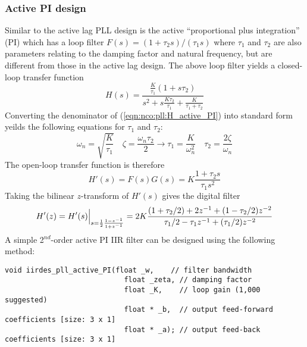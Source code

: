 \subsubsection{Active PI design}
\label{module:nco:pll:active_PI}
Similar to the active lag PLL design is the
active ``proportional plus integration'' (PI)
which has a loop filter
$F(s) = (1 + \tau_2 s)/(\tau_1 s)$
where $\tau_1$ and $\tau_2$ are also parameters relating to the damping
factor and natural frequency,
but are different from those in the active lag design.
The above loop filter yields a closed-loop transfer function
%
\begin{equation}
\label{eqn:nco:pll:H_active_PI}
    H(s) = \frac{
                \frac{K}{\tau_1} (1 + s\tau_2)
           } {
                s^2 + s\frac{K\tau_2}{\tau_1} + \frac{K}{\tau_1 + \tau_2}
           }
\end{equation}
%
Converting the denominator of (\ref{eqn:nco:pll:H_active_PI}) into
standard form yeilds the following equations for $\tau_1$ and $\tau_2$:
%
\begin{equation}
    \omega_n = \sqrt{\frac{K}{\tau_1}}
    \,\,\,\,\,\,
    \zeta = \frac{\omega_n \tau_2}{2}
        \rightarrow
    \tau_1 = \frac{K}{\omega_n^2}
    \,\,\,\,\,\,
    \tau_2 = \frac{2\zeta}{\omega_n}
\end{equation}
%
The open-loop transfer function is therefore
%
\begin{equation}
    H'(s) = F(s)G(s) = K \frac{1 + \tau_2 s}{\tau_1 s^2}
\end{equation}
%
Taking the bilinear $z$-transform of $H'(s)$ gives the digital filter
%
\begin{equation}
    H'(z) = H'(s)\Bigl.\Bigr|_{s = \frac{1}{2}\frac{1-z^{-1}}{1+z^{-1}}}
          = 2 K \frac{
                (1+\tau_2/2) + 2 z^{-1}     + ( 1 - \tau_2/2)z^{-2}
          } {
                \tau_1/2 -\tau_1 z^{-1} + (\tau_1/2)z^{-2}
          }
\end{equation}
%
A simple 2$^{nd}$-order active PI IIR filter can be designed using the
following method:
%
\begin{Verbatim}[fontsize=\small]
  void iirdes_pll_active_PI(float _w,    // filter bandwidth
                            float _zeta, // damping factor
                            float _K,    // loop gain (1,000 suggested)
                            float * _b,  // output feed-forward coefficients [size: 3 x 1]
                            float * _a); // output feed-back coefficients [size: 3 x 1]
\end{Verbatim}
%



